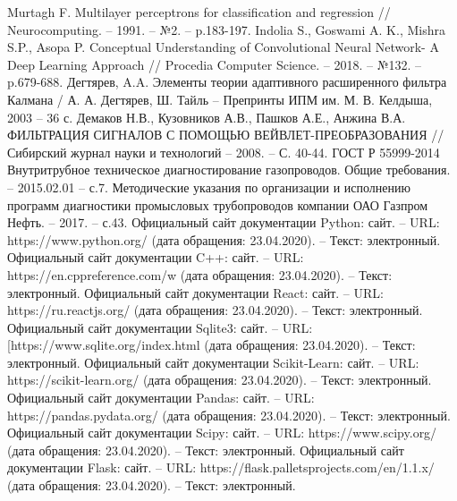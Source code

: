\documentclass[a4paper,article,14pt]{extarticle}
\begin{document}
\begin{thebibliography}{1}
 Murtagh F. Multilayer perceptrons for classification and regression // Neurocomputing. – 1991. – №2. –  p.183-197.
 Indolia S., Goswami A. K., Mishra S.P., Asopa P. Conceptual Understanding of Convolutional Neural Network- A Deep Learning Approach // Procedia Computer Science. – 2018. – №132. –  p.679-688.
 Дегтярев, A.A. Элементы теории адаптивного расширенного фильтра Калмана / А. А. Дегтярев, Ш. Тайль – Препринты ИПМ им. М. В. Келдыша, 2003 – 36 с.
 Демаков Н.В., Кузовников А.В., Пашков А.Е., Анжина В.А.  ФИЛЬТРАЦИЯ СИГНАЛОВ С ПОМОЩЬЮ ВЕЙВЛЕТ-ПРЕОБРАЗОВАНИЯ // Сибирский журнал науки и технологий – 2008.  – С. 40-44.
 ГОСТ Р 55999-2014 Внутритрубное техническое диагностирование газопроводов. Общие требования. – 2015.02.01 – с.7.
 Методические указания по организации и исполнению программ диагностики промысловых трубопроводов компании ОАО  \flqq Газпром Нефть\frqq. – 2017. – с.43.
 Официальный сайт документации Python: сайт. – URL: https://www.python.org/ (дата обращения: 23.04.2020). – Текст: электронный.
 Официальный сайт документации C++: сайт. – URL: https://en.cppreference.com/w (дата обращения: 23.04.2020). – Текст: электронный.
 Официальный сайт документации React: сайт. – URL: https://ru.reactjs.org/ (дата обращения: 23.04.2020). – Текст: электронный.
 Официальный сайт документации Sqlite3: сайт. – URL: [https://www.sqlite.org/index.html (дата обращения: 23.04.2020). – Текст: электронный.
 Официальный сайт документации Scikit-Learn: сайт. – URL: https://scikit-learn.org/ (дата обращения: 23.04.2020). – Текст: электронный.
 Официальный сайт документации Pandas: сайт. – URL: https://pandas.pydata.org/ (дата обращения: 23.04.2020). – Текст: электронный.
 Официальный сайт документации Scipy: сайт. – URL: https://www.scipy.org/ (дата обращения: 23.04.2020). – Текст: электронный.
 Официальный сайт документации Flask: сайт. – URL: https://flask.palletsprojects.com/en/1.1.x/ (дата обращения: 23.04.2020). – Текст: электронный.

\end{thebibliography}
\end{document}
